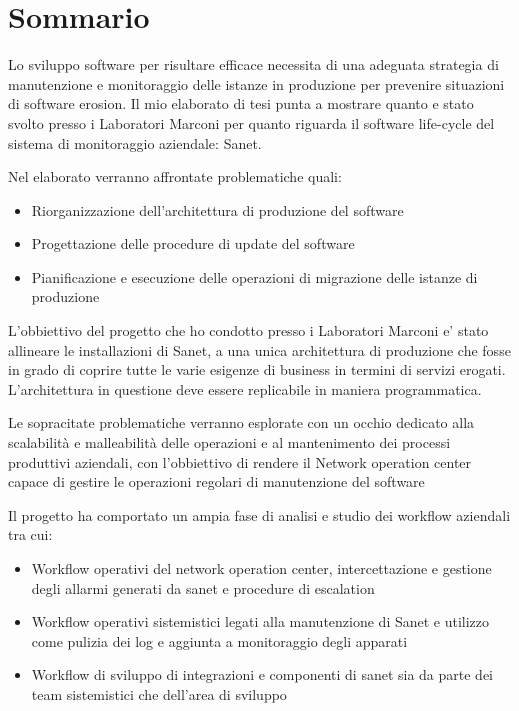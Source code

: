 \documentclass[12pt,a4paper,twoside,openright]{book}
\begin{document}
\frontmatter

\maketitle

\chapter*{Sommario}

Lo sviluppo software per risultare efficace necessita di una adeguata strategia di manutenzione e monitoraggio delle istanze in produzione per prevenire situazioni di software erosion. Il mio elaborato di tesi punta a mostrare quanto e stato svolto presso i Laboratori Marconi per quanto riguarda il software life-cycle del sistema di monitoraggio aziendale: Sanet.

Nel elaborato verranno affrontate problematiche quali:

\begin{itemize}
  \item Riorganizzazione dell'architettura di produzione del software
  \item Progettazione delle procedure di update del software
  \item Pianificazione e esecuzione delle operazioni di migrazione delle istanze di produzione
\end{itemize}

L'obbiettivo del progetto che ho condotto presso i Laboratori Marconi e' stato allineare le installazioni di Sanet, a una unica architettura di produzione che fosse in grado di coprire tutte le varie esigenze di business in termini di servizi erogati. L'architettura in questione deve essere replicabile in maniera programmatica.

Le sopracitate problematiche verranno esplorate con un occhio dedicato alla scalabilità e malleabilità delle operazioni e al mantenimento dei processi produttivi aziendali, con l'obbiettivo di rendere il Network operation center capace di gestire le operazioni regolari di manutenzione del software

Il progetto ha comportato un ampia fase di analisi e studio dei workflow aziendali tra cui:

\begin{itemize}
  \item Workflow operativi del network operation center, intercettazione e gestione degli allarmi generati da sanet e procedure di escalation
  \item Workflow operativi sistemistici legati alla manutenzione di Sanet e utilizzo come pulizia dei log e aggiunta a monitoraggio degli apparati
  \item Workflow di sviluppo di integrazioni e componenti di sanet sia da parte dei team sistemistici che dell'area di sviluppo
\end{itemize}
\end{document}
